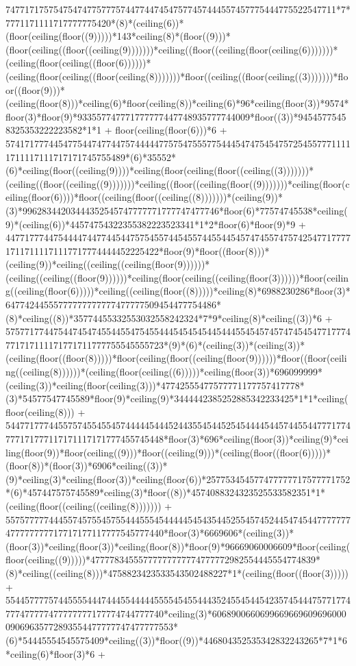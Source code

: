 747717175754754747757775744774474547577457444557457775444775522547711*7*7771171111717777775420*(8)*(ceiling(6))*(floor(ceiling(floor((9)))))*143*ceiling(8)*(floor((9)))*(floor(ceiling((floor((ceiling(9)))))))*ceiling((floor((ceiling(floor(ceiling(6)))))))*(ceiling(floor(ceiling((floor(6))))))*(ceiling(floor(ceiling((floor(ceiling(8)))))))*floor((ceiling((floor(ceiling((3)))))))*floor((floor(9)))*(ceiling(floor(8)))*ceiling(6)*floor(ceiling(8))*ceiling(6)*96*ceiling(floor(3))*9574*floor(3)*floor(9)*933557747771777777447748935777744009*floor((3))*94545775458325353222223582*1*1 + floor(ceiling(floor(6)))*6 + 5741717774454775447477447574444477575475557754445474754547572545577711111711117111717171745755489*(6)*35552*(6)*ceiling(floor((ceiling(9))))*ceiling(floor(ceiling(floor((ceiling((3)))))))*(ceiling((floor((ceiling((9)))))))*ceiling((floor((ceiling(floor((9)))))))*ceiling(floor(ceiling(floor(6))))*floor((ceiling(floor((ceiling((8)))))))*(ceiling(9))*(3)*99628344203444352545747777771777747477746*floor(6)*77574745538*ceiling(9)*(ceiling(6))*44574754322355382223523341*1*2*floor(6)*floor(9)*9 + 44771777447544447447744544757545574454557445544545747455747574254771777717117111171117717774444452225422*floor(9)*floor((floor(8)))*(ceiling(9))*ceiling((ceiling((ceiling(floor(9))))))*(ceiling((ceiling((floor(9))))))*ceiling(floor(ceiling((ceiling(floor(3))))))*floor(ceiling((ceiling(floor(6)))))*ceiling((ceiling(floor((8)))))*ceiling(8)*6988230286*floor(3)*64774244555777777777777477777509454477754486*(8)*ceiling((8))*35774455332553032558242324*7*9*ceiling(8)*ceiling((3))*6 + 575771774475447454745544554754554445454545445444554545745747454547717774771717111171771711777755545555723*(9)*(6)*(ceiling(3))*(ceiling(3))*(ceiling(floor((floor(8)))))*floor(ceiling(floor((ceiling(floor(9))))))*floor((floor(ceiling((ceiling(8))))))*(ceiling(floor(ceiling((6)))))*ceiling(floor(3))*696099999*(ceiling(3))*ceiling(floor(ceiling(3)))*47742555477577771177757417778*(3)*54577547745589*floor(9)*ceiling(9)*3444442385252885342233425*1*1*ceiling(floor(ceiling(8))) + 544771777445575745545545744444544452443554544525454444544574455447771774777171777117171117171777455745448*floor(3)*696*ceiling(floor(3))*ceiling(9)*ceiling(floor(9))*floor(ceiling((9)))*floor((ceiling(9)))*(ceiling(floor((floor(6)))))*(floor(8))*(floor(3))*6906*ceiling((3))*(9)*ceiling(3)*ceiling(floor(3))*ceiling(floor(6))*257753454577477777717577771752*(6)*457447575745589*ceiling(3)*floor((8))*4574088324323525533582351*1*(ceiling(floor((ceiling((ceiling(8))))))) + 557577777444557457554575544455545444445454354452554574524454745447777777477777777717717177117777545777440*floor(3)*6669606*(ceiling(3))*(floor(3))*ceiling(floor(3))*ceiling(floor(8))*floor(9)*96669060006609*floor(ceiling(floor(ceiling((9)))))*47777834555777777777774777772982554445554774839*(8)*ceiling((ceiling(8)))*4758823423533543502488227*1*(ceiling(floor((floor(3))))) + 554457777574455554447444554444455554545544435245545445423574544475771774777477777477777777177774744777740*ceiling(3)*606890066069966966960969600009069635772893554477777747477777553*(6)*54445554545575409*ceiling((3))*floor((9))*446804352535342832243265*7*1*6*ceiling(6)*floor(3)*6 + 